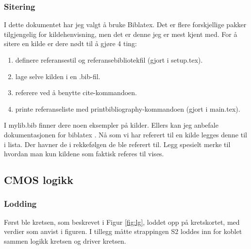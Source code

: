 \subsubsection{Sitering}
I dette dokumentet har jeg valgt å bruke Biblatex. Det er flere forskjellige pakker tilgjengelig for
kildehenvisning, men det er denne jeg er mest kjent med. For å sitere en kilde er dere nødt til å gjøre 4 ting:
\begin{enumerate}
    \item definere referansestil og referansebibliotekfil (gjort i setup.tex).
    \item lage selve kilden i en .bib-fil.
    \item referere ved å benytte cite-kommandoen.
    \item printe referanseliste med printbibliography-kommandoen (gjort i main.tex).
\end{enumerate}

I mylib.bib finner dere noen eksempler på kilder. Ellers kan jeg anbefale dokumentasjonen for biblatex \cite{biblatex}.
Nå som vi har referert til en kilde legges denne til i lista. Der havner de i rekkefølgen de ble referert til.
Legg spesielt merke til hvordan man kun kildene som faktisk referes til vises. 


\newpage %
\subsection{CMOS logikk}

\subsubsection{Lodding}
Først ble kretsen, som beskrevet i Figur \ref{fig:lg}, loddet opp på kretskortet, med verdier som anvist i figuren. I tillegg måtte strappingen S2 loddes inn for koblet sammen logikk kretsen og driver kretsen.


